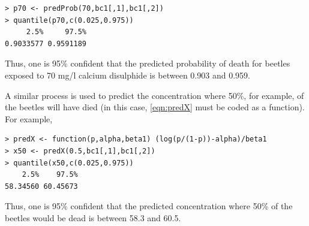 \documentclass[10pt,openany]{book}\usepackage[]{graphicx}\usepackage[]{color}
\makeatletter
\newenvironment{kframe}{%
 \def\at@end@of@kframe{}%
 \ifinner\ifhmode%
  \def\at@end@of@kframe{\end{minipage}}%
  \begin{minipage}{\columnwidth}%
 \fi\fi%
 \def\FrameCommand##1{\hskip\@totalleftmargin \hskip-\fboxsep
 \colorbox{shadecolor}{##1}\hskip-\fboxsep
     \hskip-\linewidth \hskip-\@totalleftmargin \hskip\columnwidth}%
 \MakeFramed {\advance\hsize-\width
   \@totalleftmargin\z@ \linewidth\hsize
   \@setminipage}}%
 {\par\unskip\endMakeFramed%
 \at@end@of@kframe}
\newenvironment{knitrout}{}{} %
\makeatother
\begin{document}
\begin{knitrout}
\color{fgcolor}\begin{kframe}
\begin{verbatim}
> p70 <- predProb(70,bc1[,1],bc1[,2])
> quantile(p70,c(0.025,0.975))
     2.5%     97.5% 
0.9033577 0.9591189 
\end{verbatim}
\end{kframe}
\end{knitrout}
Thus, one is 95\% confident that the predicted probability of death for beetles exposed to 70 mg/l calcium disulphide is between 0.903 and 0.959.

A similar process is used to predict the concentration where 50\%, for example, of the beetles will have died (in this case, \eqref{eqn:predX} must be coded as a function).  For example,
\begin{knitrout}
\color{fgcolor}\begin{kframe}
\begin{verbatim}
> predX <- function(p,alpha,beta1) (log(p/(1-p))-alpha)/beta1
> x50 <- predX(0.5,bc1[,1],bc1[,2])
> quantile(x50,c(0.025,0.975))
    2.5%    97.5% 
58.34560 60.45673 
\end{verbatim}
\end{kframe}
\end{knitrout}
Thus, one is 95\% confident that the predicted concentration where 50\% of the beetles would be dead is between 58.3 and 60.5.
\end{document}
